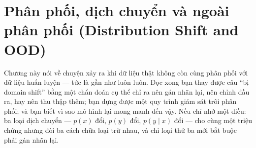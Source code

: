 \documentclass[../../deep_learning.tex]{subfiles}
\begin{document}
\chapter{Phân phối, dịch chuyển và ngoài phân phối (Distribution Shift and OOD)}

\begin{tomtat}
Chương này nói về chuyện xảy ra khi dữ liệu thật không còn cùng phân phối với dữ liệu huấn luyện --- tức là gần như luôn luôn. Đọc xong bạn thay được câu ``bị domain shift'' bằng một chẩn đoán cụ thể chỉ ra nên gán nhãn lại, nên chỉnh đầu ra, hay nên thu thập thêm; bạn dựng được một quy trình giám sát trôi phân phối; và bạn biết vì sao mô hình lại mong manh đến vậy. Nếu chỉ nhớ một điều: ba loại dịch chuyển --- \(p(x)\) đổi, \(p(y)\) đổi, \(p(y\mid x)\) đổi --- cho cùng một triệu chứng nhưng đòi ba cách chữa loại trừ nhau, và chỉ loại thứ ba mới bắt buộc phải gán nhãn lại.
\end{tomtat}
\end{document}
